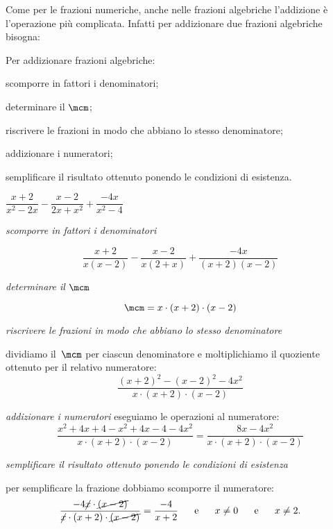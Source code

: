 Come per le frazioni numeriche, anche nelle frazioni algebriche l'addizione
è l'operazione più complicata. Infatti per addizionare due frazioni 
algebriche bisogna:

\begin{procedura}
 Per addizionare frazioni algebriche:
\begin{enumeratea}
\item scomporre in fattori i denominatori;
\item determinare il \(\mcm\);
\item riscrivere le frazioni in modo che abbiano lo stesso denominatore;
\item addizionare i numeratori;
\item semplificare il risultato ottenuto ponendo le condizioni di esistenza.
\end{enumeratea}
\end{procedura}

 \begin{esempio}
\(\dfrac{x+2}{x^{2}-2x}-\dfrac{x-2}{2x+x^{2}}+\dfrac{-4x}{x^{2}-4}\)
\begin{enumeratea}
 \item \emph{scomporre in fattori i denominatori}
 
  \[\dfrac{x+2}{x(x-2)}-\dfrac{x-2}{x(2+x)}+\dfrac{-4x}{(x+2)(x-2)}\]
  
 \item \emph{determinare il \(\mcm\)}
 
  \[\mcm = x\cdot (x+2) \cdot (x-2)\]
  

 \item \emph{riscrivere le frazioni in modo che abbiano lo stesso
 denominatore}

dividiamo il~\(\mcm\) per ciascun denominatore e moltiplichiamo il 
quoziente ottenuto per il relativo numeratore:
\[\dfrac{(x+2)^{2}-(x-2)^{2}-4x^{2}}{x\cdot(x+2)\cdot(x-2)}\]
 \item \emph{addizionare i numeratori} eseguiamo le operazioni al numeratore:
    \begin{equation*}
     \dfrac{x^{2}+4x+4-x^{2}+4x-4-4x^{2}}{x\cdot(x+2)\cdot(x-2)}=
     \dfrac{8x-4x^{2}}{x\cdot(x+2)\cdot(x-2)}
     \end{equation*}
 \item \emph{semplificare il risultato ottenuto ponendo le condizioni di 
  esistenza}
 
  per semplificare la frazione dobbiamo scomporre il numeratore:
    \begin{equation*}
    \dfrac{-4\cancel{x}\cdot\cancel{(x-2)}}
         {\cancel{x}\cdot(x+2)\cdot\cancel{(x-2)}}=
    \dfrac{-4}{x+2} \quad  \text{~~e~~} \quad x \neq 0 \quad  \text{~~e~~} \quad x 
\neq 2.
    \end{equation*}
\end{enumeratea}
 \end{esempio}

